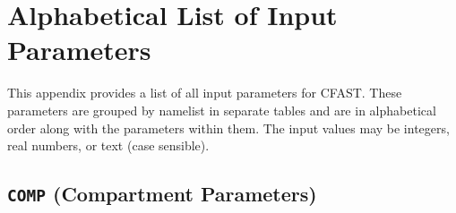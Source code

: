 \chapter{Alphabetical List of Input Parameters} \label{sec:CFAST_Keywords}



This appendix provides a list of all input parameters for CFAST. These parameters are grouped by namelist in separate tables and are in alphabetical order along with the parameters within them. The input values may be integers, real numbers, or text (case sensible).


\section{\texorpdfstring{{\tt COMP}}{COMP} (Compartment Parameters)}


